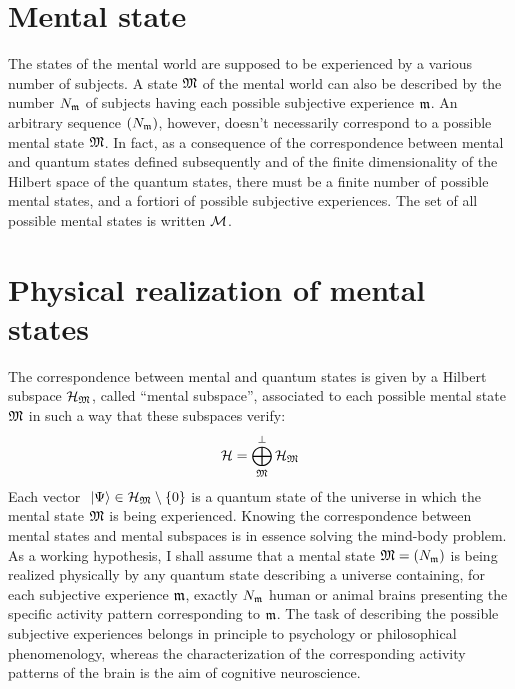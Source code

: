 \section{Mental state}

The states of the mental world are supposed to be experienced by a various number of subjects. A state $\mathfrak{M}$ of the mental world can also be described by the number ${N}_{\mathfrak{m}}$ of subjects having each possible subjective experience $\mathfrak{m}$. An arbitrary sequence $({N}_{\mathfrak{m}})$, however, doesn't necessarily correspond to a possible mental state $\mathfrak{M}$. In fact, as a consequence of the correspondence between mental and quantum states defined subsequently and of the finite dimensionality of the Hilbert space of the quantum states, there must be a finite number of possible mental states, and a fortiori of possible subjective experiences. The set of all possible mental states is written $\mathcal M$.

\section{Physical realization of mental states}

The correspondence between mental and quantum states is given by a Hilbert subspace $\mathcal H_{\mathfrak{M}}$, called ``mental subspace'', associated to each possible mental state $\mathfrak{M}$ in such a way that these subspaces verify:
\begin{equation*}
\mathcal H = \bigoplus_{\mathfrak{M}}^\perp \mathcal H_{\mathfrak{M}}
\end{equation*}
Each vector $\ \left|{\Psi}\right\rangle \in \mathcal H_{\mathfrak{M}} \setminus \{0\}$ is a quantum state of the universe in which the mental state $\mathfrak{M}$ is being experienced. Knowing the correspondence between mental states and mental subspaces is in essence solving the mind-body problem. As a working hypothesis, I shall assume that a mental state $\mathfrak{M} = ({N}_{\mathfrak{m}})$ is being realized physically by any quantum state describing a universe containing, for each subjective experience $\mathfrak{m}$, exactly ${N}_{\mathfrak{m}}$ human or animal brains presenting the specific activity pattern corresponding to $\mathfrak{m}$. The task of describing the possible subjective experiences belongs in principle to psychology or philosophical phenomenology, whereas the characterization of the corresponding activity patterns of the brain is the aim of cognitive neuroscience.

